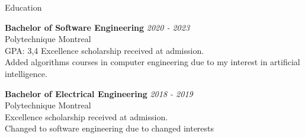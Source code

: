 \documentclass{resume} %
\begin{document}
	
	
	\begin{rSection}{Education}
		
		{\bf Bachelor of Software Engineering} \hfill {\em 2020 - 2023} 
		\\ Polytechnique Montreal
		\\GPA: 3,4 \hspace{0.5cm}  Excellence scholarship received at admission.
		\\Added algorithms courses in computer engineering due to my interest in artificial intelligence.

		{\bf Bachelor of Electrical Engineering} \hfill {\em 2018 - 2019} 
		\\ Polytechnique Montreal
		\\ Excellence scholarship received at admission.
		\\ Changed to software engineering due to changed interests
		
	\end{rSection}
	
\end{document}
